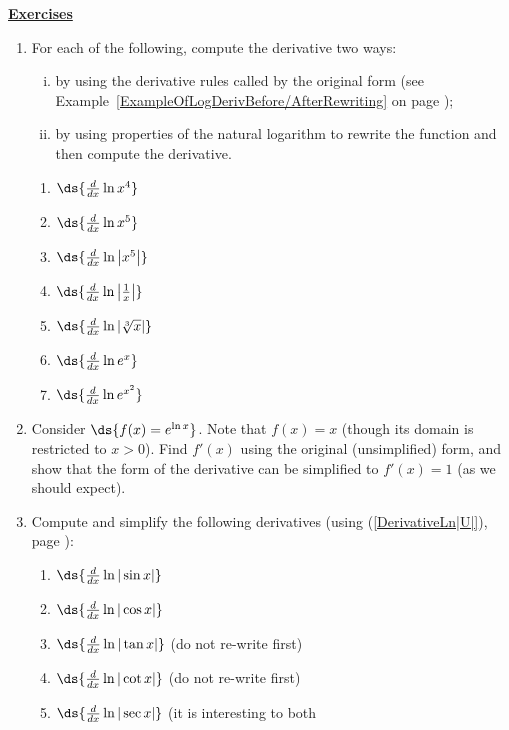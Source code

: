 \begin{center}\underline{\Large{\bf Exercises}}\end{center}
\bigskip
\begin{multicols}{2}
\begin{enumerate}
\item For each of the following, compute the derivative
two ways:
\begin{enumerate}[(i)]
 \item by using 
       the derivative rules called by the original
       form (see Example~\ref{ExampleOfLogDerivBefore/AfterRewriting} on
                   page \pageref{ExampleOfLogDerivBefore/AfterRewriting});
 \item by using properties of the natural logarithm to rewrite
       the function and then compute the derivative.
\end{enumerate}
   \begin{enumerate}
   \item $\ds{\frac{d}{dx}\ln x^4}$
   \item $\ds{\frac{d}{dx}\ln x^5}$
   \item $\ds{\frac{d}{dx}\ln\left|x^5\right|}$
   \item $\ds{\frac{d}{dx}\ln\left|\frac1x\right|}$
   \item $\ds{\frac{d}{dx}\ln\left|\sqrt[3]{x}\right|}$
   \item $\ds{\frac{d}{dx}\ln e^x}$
   \item $\ds{\frac{d}{dx}\ln e^{x^2}}$
   \end{enumerate}
\item Consider $\ds{f(x)=e^{\ln x}}$.  
      Note that $f(x)=x$ (though its domain is restricted to $x>0$).
      Find $f'(x)$ using the original (unsimplified)
      form, and show that the form of the derivative 
      can be simplified to $f'(x)=1$ (as we should 
      expect).
\item Compute and simplify 
      the following derivatives (using (\ref{DerivativeLn|U|}),
      page \pageref{DerivativeLn|U|}):
   \begin{enumerate}
   \item $\ds{\frac{d}{dx}\ln|\sin x|}$
   \item $\ds{\frac{d}{dx}\ln|\cos x|}$
   \item $\ds{\frac{d}{dx}\ln|\tan x|}$ (do not re-write first)
   \item $\ds{\frac{d}{dx}\ln|\cot x|}$ (do not re-write first)
   \item $\ds{\frac{d}{dx}\ln|\sec x|}$ (it is interesting to both

\end{enumerate}
\end{enumerate}
\end{multicols}
